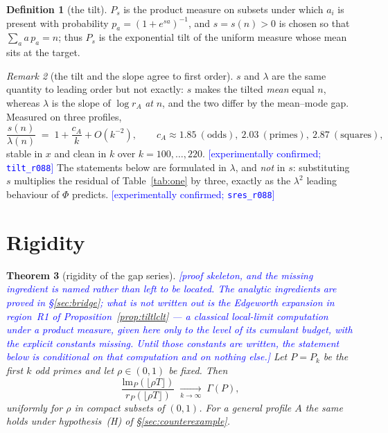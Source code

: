 \documentclass[11pt,a4paper]{article}
\theoremstyle{plain}
\newtheorem{theorem}{Theorem}[section]
\theoremstyle{definition}
\newtheorem{definition}[theorem]{Definition}
\theoremstyle{remark}
\newtheorem{remark}[theorem]{Remark}
\newcommand{\lm}{\mathrm{lm}}
\newcommand{\STATUS}[1]{\textcolor{blue}{\textsf{[#1]}}}
\begin{document}
\begin{definition}[the tilt]\label{def:tilt}
$P_s$ is the product measure on subsets under which $a_i$ is present with probability
$p_{a}=(1+e^{sa})^{-1}$, and $s=s(n)>0$ is chosen so that $\sum_a a\,p_a=n$; thus $P_s$ is the
exponential tilt of the uniform measure whose mean sits at the target.
\end{definition}

\begin{remark}[the tilt and the slope agree to first order]\label{rem:tiltslope}
$s$ and $\lambda$ are the same quantity to leading order but not exactly: $s$ makes the
tilted \emph{mean} equal $n$, whereas $\lambda$ is the slope of $\log r_A$ \emph{at} $n$, and
the two differ by the mean--mode gap. Measured on three profiles,
\[
   \frac{s(n)}{\lambda(n)}\;=\;1+\frac{c_A}{k}+O(k^{-2}),
   \qquad c_A\approx1.85\ (\text{odds}),\ 2.03\ (\text{primes}),\ 2.87\ (\text{squares}),
\]
stable in $x$ and clean in $k$ over $k=100,\dots,220$.
\STATUS{experimentally confirmed; \texttt{tilt\_r088}}
The statements below are formulated in $\lambda$, and \emph{not} in $s$: substituting $s$
multiplies the residual of Table~\ref{tab:one} by three, exactly as the $\lambda^{2}$ leading
behaviour of $\Phi$ predicts. \STATUS{experimentally confirmed; \texttt{sres\_r088}}
\end{remark}

\section{Rigidity}\label{sec:rigid}

\begin{theorem}[rigidity of the gap series]\label{thm:rigid}
\STATUS{proof skeleton, and the missing ingredient is named rather than left to be located.
The analytic ingredients are proved in \S\ref{sec:bridge}; what is \emph{not} written out is
the Edgeworth expansion in region~R1 of Proposition~\ref{prop:tiltlclt} --- a classical
local-limit computation under a product measure, given here only to the level of its cumulant
budget, with the explicit constants missing. Until those constants are written, the statement
below is conditional on that computation and on nothing else.}
Let $P=P_k$ be the first $k$ odd primes and let $\rho\in(0,1)$ be fixed. Then
\[
  \frac{\lm_P(\lfloor\rho T\rfloor)}{r_P(\lfloor\rho T\rfloor)}
  \;\xrightarrow[k\to\infty]{}\;\Gamma(P),
\]
uniformly for $\rho$ in compact subsets of $(0,1)$. For a general profile $A$ the same holds
under hypothesis~\textup{(H)} of \S\ref{sec:counterexample}.
\end{theorem}
\end{document}
